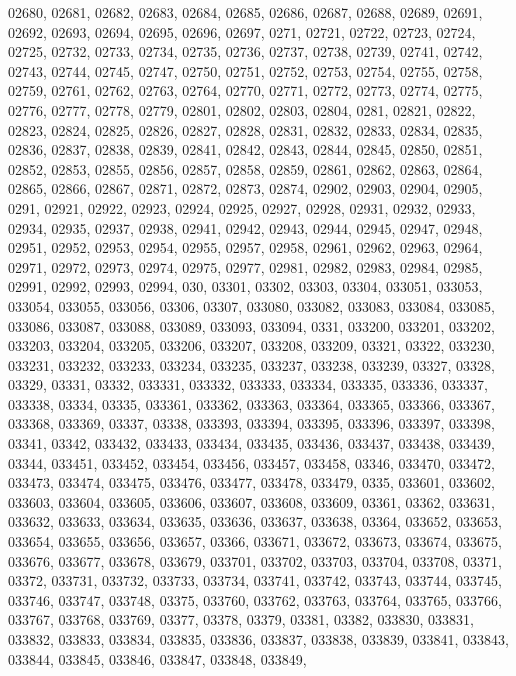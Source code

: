 {02680,
02681,
02682,
02683,
02684,
02685,
02686,
02687,
02688,
02689,
02691,
02692,
02693,
02694,
02695,
02696,
02697,
0271,
02721,
02722,
02723,
02724,
02725,
02732,
02733,
02734,
02735,
02736,
02737,
02738,
02739,
02741,
02742,
02743,
02744,
02745,
02747,
02750,
02751,
02752,
02753,
02754,
02755,
02758,
02759,
02761,
02762,
02763,
02764,
02770,
02771,
02772,
02773,
02774,
02775,
02776,
02777,
02778,
02779,
02801,
02802,
02803,
02804,
0281,
02821,
02822,
02823,
02824,
02825,
02826,
02827,
02828,
02831,
02832,
02833,
02834,
02835,
02836,
02837,
02838,
02839,
02841,
02842,
02843,
02844,
02845,
02850,
02851,
02852,
02853,
02855,
02856,
02857,
02858,
02859,
02861,
02862,
02863,
02864,
02865,
02866,
02867,
02871,
02872,
02873,
02874,
02902,
02903,
02904,
02905,
0291,
02921,
02922,
02923,
02924,
02925,
02927,
02928,
02931,
02932,
02933,
02934,
02935,
02937,
02938,
02941,
02942,
02943,
02944,
02945,
02947,
02948,
02951,
02952,
02953,
02954,
02955,
02957,
02958,
02961,
02962,
02963,
02964,
02971,
02972,
02973,
02974,
02975,
02977,
02981,
02982,
02983,
02984,
02985,
02991,
02992,
02993,
02994,
030,
03301,
03302,
03303,
03304,
033051,
033053,
033054,
033055,
033056,
03306,
03307,
033080,
033082,
033083,
033084,
033085,
033086,
033087,
033088,
033089,
033093,
033094,
0331,
033200,
033201,
033202,
033203,
033204,
033205,
033206,
033207,
033208,
033209,
03321,
03322,
033230,
033231,
033232,
033233,
033234,
033235,
033237,
033238,
033239,
03327,
03328,
03329,
03331,
03332,
033331,
033332,
033333,
033334,
033335,
033336,
033337,
033338,
03334,
03335,
033361,
033362,
033363,
033364,
033365,
033366,
033367,
033368,
033369,
03337,
03338,
033393,
033394,
033395,
033396,
033397,
033398,
03341,
03342,
033432,
033433,
033434,
033435,
033436,
033437,
033438,
033439,
03344,
033451,
033452,
033454,
033456,
033457,
033458,
03346,
033470,
033472,
033473,
033474,
033475,
033476,
033477,
033478,
033479,
0335,
033601,
033602,
033603,
033604,
033605,
033606,
033607,
033608,
033609,
03361,
03362,
033631,
033632,
033633,
033634,
033635,
033636,
033637,
033638,
03364,
033652,
033653,
033654,
033655,
033656,
033657,
03366,
033671,
033672,
033673,
033674,
033675,
033676,
033677,
033678,
033679,
033701,
033702,
033703,
033704,
033708,
03371,
03372,
033731,
033732,
033733,
033734,
033741,
033742,
033743,
033744,
033745,
033746,
033747,
033748,
03375,
033760,
033762,
033763,
033764,
033765,
033766,
033767,
033768,
033769,
03377,
03378,
03379,
03381,
03382,
033830,
033831,
033832,
033833,
033834,
033835,
033836,
033837,
033838,
033839,
033841,
033843,
033844,
033845,
033846,
033847,
033848,
033849,
}
